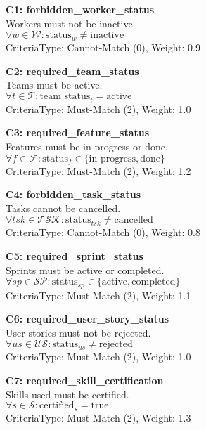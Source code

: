 \documentclass[12pt]{article}
\begin{document}
    \item \textbf{C1: forbidden\_worker\_status} \\
    Workers must not be inactive. \\
    $\forall w \in \mathcal{W}: \text{status}_w \neq \text{inactive}$ \\
    CriteriaType: Cannot-Match (0), Weight: 0.9

    \item \textbf{C2: required\_team\_status} \\
    Teams must be active. \\
    $\forall t \in \mathcal{T}: \text{team\_status}_t = \text{active}$ \\
    CriteriaType: Must-Match (2), Weight: 1.0

    \item \textbf{C3: required\_feature\_status} \\
    Features must be in progress or done. \\
    $\forall f \in \mathcal{F}: \text{status}_f \in \{\text{in progress}, \text{done}\}$ \\
    CriteriaType: Must-Match (2), Weight: 1.2

    \item \textbf{C4: forbidden\_task\_status} \\
    Tasks cannot be cancelled. \\
    $\forall tsk \in \mathcal{TSK}: \text{status}_{tsk} \neq \text{cancelled}$ \\
    CriteriaType: Cannot-Match (0), Weight: 0.8

    \item \textbf{C5: required\_sprint\_status} \\
    Sprints must be active or completed. \\
    $\forall sp \in \mathcal{SP}: \text{status}_{sp} \in \{\text{active}, \text{completed}\}$ \\
    CriteriaType: Must-Match (2), Weight: 1.1

    \item \textbf{C6: required\_user\_story\_status} \\
    User stories must not be rejected. \\
    $\forall us \in \mathcal{US}: \text{status}_{us} \neq \text{rejected}$ \\
    CriteriaType: Must-Match (2), Weight: 1.0

    \item \textbf{C7: required\_skill\_certification} \\
    Skills used must be certified. \\
    $\forall s \in \mathcal{S}: \text{certified}_s = \text{true}$ \\
    CriteriaType: Must-Match (2), Weight: 1.3
\end{document}
